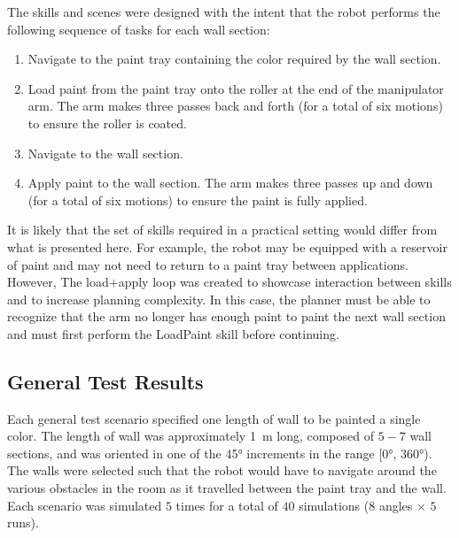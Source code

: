 The skills and scenes were designed with the intent that the robot performs the following sequence of tasks for each wall section:
\begin{enumerate}
    \item Navigate to the paint tray containing the color required by the wall section.
    \item Load paint from the paint tray onto the roller at the end of the manipulator arm. The arm makes three passes back and forth (for a total of six motions) to ensure the roller is coated.
    \item Navigate to the wall section.
    \item Apply paint to the wall section. The arm makes three passes up and down (for a total of six motions) to ensure the paint is fully applied.
\end{enumerate}
It is likely that the set of skills required in a practical setting would differ from what is presented here. For example, the robot may be equipped with a reservoir of paint and may not need to return to a paint tray between applications. However, The load+apply loop was created to showcase interaction between skills and to increase planning complexity. In this case, the planner must be able to recognize that the arm no longer has enough paint to paint the next wall section and must first perform the LoadPaint skill before continuing.

\subsection{General Test Results}
Each general test scenario specified one length of wall to be painted a single color. The length of wall was approximately \SI{1}{\meter} long, composed of $5-7$ wall sections, and was oriented in one of the \ang{45} increments in the range [\ang{0}, \ang{360}). The walls were selected such that the robot would have to navigate around the various obstacles in the room as it travelled between the paint tray and the wall. Each scenario was simulated $5$ times for a total of $40$ simulations ($8$ angles $\times$ $5$ runs).

